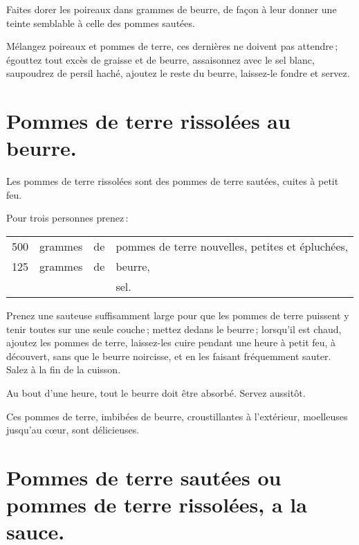 Faites dorer les poireaux dans {\mmm} grammes de beurre, de façon à leur
donner une teinte semblable à celle des pommes sautées.

Mélangez poireaux et pommes de terre, ces dernières ne doivent pas attendre ;
égouttez tout excès de graisse et de beurre, assaisonnez avec le sel blanc,
saupoudrez de persil haché, ajoutez le reste du beurre, laissez-le fondre et
servez.

\section*{\centering Pommes de terre rissolées au beurre.}
{}

Les pommes de terre rissolées sont des pommes de terre sautées, cuites à petit
feu.

\medskip

Pour trois personnes prenez :

\footnotesize
\begin{longtable}{rrrp{16em}}
    500 & grammes & de & pommes de terre nouvelles, petites et épluchées,                                 \\
    125 & grammes & de & beurre,                                                                          \\
        &         &    & sel.                                                                             \\
\end{longtable}
\normalsize

Prenez une sauteuse suffisamment large pour que les pommes de terre puissent
y tenir toutes sur une seule couche ; mettez dedans le beurre ; lorsqu'il est
chaud, ajoutez les pommes de terre, laissez-les cuire pendant une heure à petit
feu, à découvert, sans que le beurre noircisse, et en les faisant fréquemment
sauter. Salez à la fin de la cuisson.

Au bout d'une heure, tout le beurre doit être absorbé. Servez aussitôt.

Ces pommes de terre, imbibées de beurre, croustillantes à l'extérieur,
moelleuses jusqu'au cœur, sont délicieuses.

\section*{\centering Pommes de terre sautées ou pommes de terre rissolées, a la sauce.}
{}


